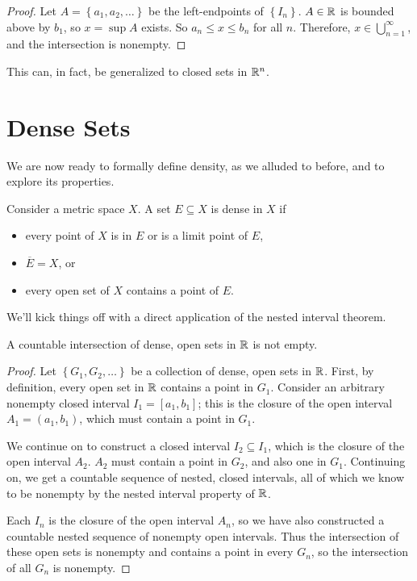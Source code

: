\documentclass[../m131main.tex]{subfiles}
\begin{document}
\begin{proof}
    Let $A = \left\{ a_1, a_2, \ldots \right\}$ be the left-endpoints of $\left\{ I_n \right\}$.
    $A \in \mathbb{R}$ is bounded above by $b_1$, so $x = \sup A$ exists.
    So $a_n \leq x \leq b_n$ for all $n$.
    Therefore, $x \in \bigcup_{n=1}^\infty$, and the intersection is nonempty.
\end{proof}

This can, in fact, be generalized to closed sets in $\mathbb{R}^n$.

\section{Dense Sets}
We are now ready to formally define density, as we alluded to before, and to explore its properties.

\begin{definition}
    Consider a metric space $X$.
    A set $E \subseteq X$ is dense in $X$ if
    \begin{itemize}
        \item every point of $X$ is in $E$ or is a limit point of $E$,
        \item $\overline{E} = X$, or
        \item every open set of $X$ contains a point of $E$.
    \end{itemize}
\end{definition}

We'll kick things off with a direct application of the nested interval theorem.

\begin{lemma}[]
    A countable intersection of dense, open sets in $\mathbb{R}$ is not empty.
\end{lemma}

\begin{proof}
    Let $\left\{ G_1, G_2, \ldots \right\}$ be a collection of dense, open sets in $\mathbb{R}$.
    First, by definition, every open set in $\mathbb{R}$ contains a point in $G_1$.
    Consider an arbitrary nonempty closed interval $I_1= [a_1, b_1]$; this is the closure of the open interval $A_1 = (a_1, b_1)$, which must contain a point in $G_1$.

    We continue on to construct a closed interval $I_2 \subseteq I_1$, which is the closure of the open interval $A_2$.
    $A_2$ must contain a point in $G_2$, and also one in $G_1$.
    Continuing on, we get a countable sequence of nested, closed intervals, all of which we know to be nonempty by the nested interval property of $\mathbb{R}$.

    Each $I_n$ is the closure of the open interval $A_n$, so we have also constructed a countable nested sequence of nonempty open intervals.
    Thus the intersection of these open sets is nonempty and contains a point in every $G_n$, so the intersection of all $G_n$ is nonempty.
\end{proof}
\end{document}
